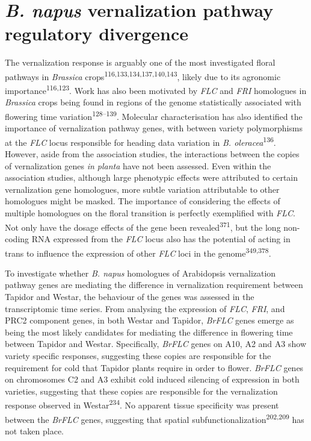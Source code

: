 \documentclass[12pt,]{book}
\begin{document}
\section{\texorpdfstring{\emph{B. napus} vernalization pathway
regulatory
divergence}{B. napus vernalization pathway regulatory divergence}}\label{section:winter:vern}

The vernalization response is arguably one of the most investigated
floral pathways in \emph{Brassica}
crops\textsuperscript{116,133,134,137,140,143}, likely due to its
agronomic importance\textsuperscript{116,123}. Work has also been
motivated by \emph{FLC} and \emph{FRI} homologues in \emph{Brassica}
crops being found in regions of the genome statistically associated with
flowering time variation\textsuperscript{128--139}. Molecular
characterisation has also identified the importance of vernalization
pathway genes, with between variety polymorphisms at the \emph{FLC}
locus responsible for heading data variation in \emph{B.
oleracea}\textsuperscript{136}. However, aside from the association
studies, the interactions between the copies of vernalization genes
\emph{in planta} have not been assessed. Even within the association
studies, although large phenotypic effects were attributed to certain
vernalization gene homologues, more subtle variation attributable to
other homologues might be masked. The importance of considering the
effects of multiple homologues on the floral transition is perfectly
exemplified with \emph{FLC}. Not only have the dosage effects of the
gene been revealed\textsuperscript{371}, but the long non-coding RNA
expressed from the \emph{FLC} locus also has the potential of acting in
trans to influence the expression of other \emph{FLC} loci in the
genome\textsuperscript{349,378}.

To investigate whether \emph{B. napus} homologues of Arabidopsis
vernalization pathway genes are mediating the difference in
vernalization requirement between Tapidor and Westar, the behaviour of
the genes was assessed in the transcriptomic time series. From analysing
the expression of \emph{FLC}, \emph{FRI}, and PRC2 component genes, in
both Westar and Tapidor, \emph{BrFLC} genes emerge as being the most
likely candidates for mediating the difference in flowering time between
Tapidor and Westar. Specifically, \emph{BrFLC} genes on A10, A2 and A3
show variety specific responses, suggesting these copies are responsible
for the requirement for cold that Tapidor plants require in order to
flower. \emph{BrFLC} genes on chromosomes C2 and A3 exhibit cold induced
silencing of expression in both varieties, suggesting that these copies
are responsible for the vernalization response observed in
Westar\textsuperscript{234}. No apparent tissue specificity was present
between the \emph{BrFLC} genes, suggesting that spatial
subfunctionalization\textsuperscript{202,209} has not taken place.
\end{document}

